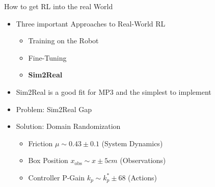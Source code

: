 \documentclass[16:9,en,navbarinfooter]{sdqbeamer}
\begin{document}
\begin{frame}{How to get RL into the real World}
	\begin{itemize}
		\item Three important Approaches to Real-World RL
		      \begin{itemize}
			      \item Training on the Robot
			      \item Fine-Tuning
			      \item \textbf{Sim2Real}
		      \end{itemize}
		\item Sim2Real is a good fit for MP3 and the simplest to implement
		\item Problem: Sim2Real Gap
		\item Solution: Domain Randomization
		      \begin{itemize}
			      \item Friction $\mu \sim 0.43 \pm 0.1$ \quad (System Dynamics)
			      \item Box Position $x_\text{obs} \sim x \pm 5cm$ \quad (Observations)
			      \item Controller P-Gain $k_p \sim k_p^* \pm 68$ \quad (Actions)
		      \end{itemize}

	\end{itemize}

\end{frame}
\end{document}
